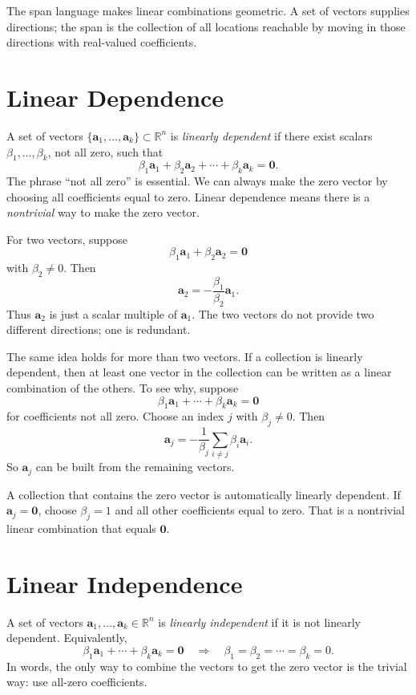 The span language makes linear combinations geometric. A set of vectors supplies directions; the span is the collection of all locations reachable by moving in those directions with real-valued coefficients.

\section{Linear Dependence}
\label{mf:linear-dependence}

A set of vectors \(\{\mathbf{a}_1,\ldots,\mathbf{a}_k\}\subset\mathbb{R}^n\) is \emph{linearly dependent} if there exist scalars \(\beta_1,\ldots,\beta_k\), not all zero, such that
\[
    \beta_1\mathbf{a}_1+\beta_2\mathbf{a}_2+\cdots+\beta_k\mathbf{a}_k=\mathbf{0}.
\]
The phrase ``not all zero'' is essential. We can always make the zero vector by choosing all coefficients equal to zero. Linear dependence means there is a \emph{nontrivial} way to make the zero vector.

For two vectors, suppose
\[
    \beta_1\mathbf{a}_1+\beta_2\mathbf{a}_2=\mathbf{0}
\]
with \(\beta_2\neq 0\). Then
\[
    \mathbf{a}_2=-\frac{\beta_1}{\beta_2}\mathbf{a}_1.
\]
Thus \(\mathbf{a}_2\) is just a scalar multiple of \(\mathbf{a}_1\). The two vectors do not provide two different directions; one is redundant.

The same idea holds for more than two vectors. If a collection is linearly dependent, then at least one vector in the collection can be written as a linear combination of the others. To see why, suppose
\[
    \beta_1\mathbf{a}_1+\cdots+\beta_k\mathbf{a}_k=\mathbf{0}
\]
for coefficients not all zero. Choose an index \(j\) with \(\beta_j\neq 0\). Then
\[
    \mathbf{a}_j
    =
    -\frac{1}{\beta_j}\sum_{i\neq j}\beta_i\mathbf{a}_i.
\]
So \(\mathbf{a}_j\) can be built from the remaining vectors.

A collection that contains the zero vector is automatically linearly dependent. If \(\mathbf{a}_j=\mathbf{0}\), choose \(\beta_j=1\) and all other coefficients equal to zero. That is a nontrivial linear combination that equals \(\mathbf{0}\).

\section{Linear Independence}
\label{mf:linear-independence}

A set of vectors \(\mathbf{a}_1,\ldots,\mathbf{a}_k\in\mathbb{R}^n\) is \emph{linearly independent} if it is not linearly dependent. Equivalently,
\[
    \beta_1\mathbf{a}_1+\cdots+\beta_k\mathbf{a}_k=\mathbf{0}
    \quad\Longrightarrow\quad
    \beta_1=\beta_2=\cdots=\beta_k=0.
\]
In words, the only way to combine the vectors to get the zero vector is the trivial way: use all-zero coefficients.

